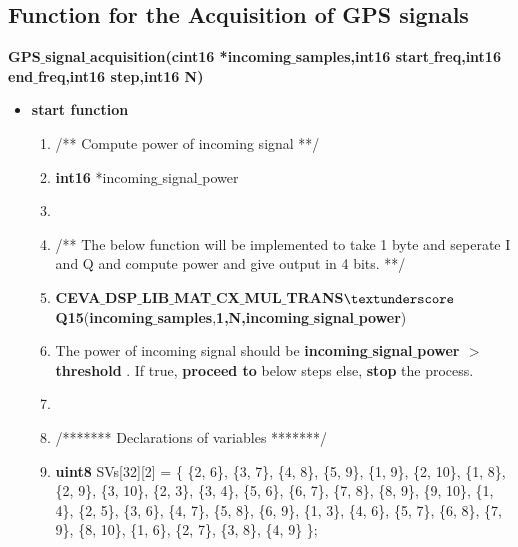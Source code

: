 \documentclass[journal,10pt,onecolumn]{article}
\begin{document}
\subsection*{Function for the Acquisition of GPS signals}

\textbf{GPS$\_$signal$\_$acquisition(cint16 *incoming$\_$samples,int16 start$\_$freq,int16 end$\_$freq,int16 step,int16 N)}
\begin{itemize}
\item[] \textbf{start function}
\begin{enumerate}
    \item[] /** Compute power of incoming signal **/
    \item[] \textbf{int16} *incoming$\_$signal$\_$power
    \item[]
    \item[] /** The below function will be implemented  to take 1 byte and seperate I and Q and compute power and give output in 4 bits. **/
    \item[] \textbf{CEVA$\_$DSP$\_$LIB$\_$MAT$\_$CX$\_$MUL$\_$TRANS$\textunderscore$Q15}(\textbf{incoming$\_$samples},\textbf{1,N,incoming$\_$signal$\_$power}) 
    \item[]  The power of incoming signal should be \textbf{ incoming$\_$signal$\_$power $>$ threshold} . If true, \textbf{proceed to} below steps else, \textbf{stop} the process.
    \item[]
    \item[] /******* Declarations of variables *******/
    \item[] \textbf{uint8} SVs[32][2] = \{
        \{2, 6\},
        \{3, 7\},
        \{4, 8\},
        \{5, 9\},
        \{1, 9\},
        \{2, 10\},
        \{1, 8\},
        \{2, 9\},
        \{3, 10\},
        \{2, 3\},
        \{3, 4\},
        \{5, 6\},
        \{6, 7\},
        \{7, 8\},
        \{8, 9\},
        \{9, 10\},
        \{1, 4\},
        \{2, 5\},
        \{3, 6\},
        \{4, 7\},
        \{5, 8\}, 
        \{6, 9\},
        \{1, 3\},
        \{4, 6\},
        \{5, 7\}, 
        \{6, 8\},
        \{7, 9\},
        \{8, 10\},
        \{1, 6\},
        \{2, 7\},
        \{3, 8\},
        \{4, 9\}
    \};
     

\end{enumerate}
\end{itemize}
\end{document}
